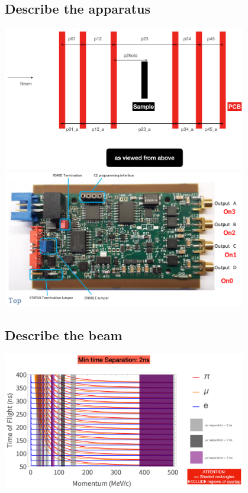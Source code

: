 \begin{refsection}
\subsection{Describe the apparatus}
\includegraphics[width=0.8\textwidth]{Figures/muEDM_Dec2021/Positions_Telescope.png}\\
\includegraphics[width=0.8\textwidth]{Figures/muEDM_Dec2021/HV.png}\\
\subsection{Describe the beam}
\includegraphics[width=0.8\textwidth]{Figures/muEDM_Dec2021/ToFPlots-0.png}\\


\end{refsection}
